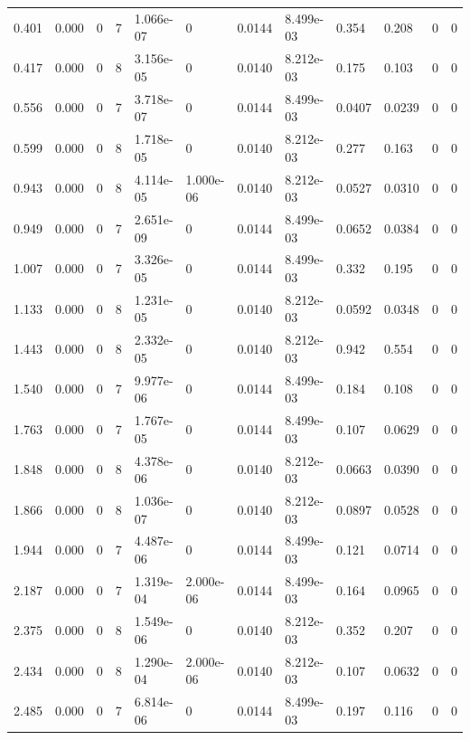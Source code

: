 \documentclass[preview]{standalone}
\begin{document}
{{\begin{tabular}{L{1.2cm}C{1.2cm} C{0.3cm}C{0.5cm} C{1.4cm}C{1.4cm} C{1.4cm}C{1.4cm} C{1.6cm}C{1.6cm} C{1.6cm}C{1.6cm}}
  0.401  &  0.000  & 0     &  7 &  1.066e-07  & 0  &  0.0144&   8.499e-03& 0.354 & 0.208   &  0 & 0  \\ 
  0.417  &  0.000  & 0     &  8 &  3.156e-05  & 0  &  0.0140&   8.212e-03& 0.175 & 0.103   &  0 & 0  \\ 
  0.556  &  0.000  & 0     &  7 &  3.718e-07  & 0  &  0.0144&   8.499e-03& 0.0407 & 0.0239   &  0 & 0  \\ 
  0.599  &  0.000  & 0     &  8 &  1.718e-05  & 0  &  0.0140&   8.212e-03& 0.277 & 0.163   &  0 & 0  \\ 
  0.943  &  0.000  & 0     &  8 &  4.114e-05  & 1.000e-06  &  0.0140&   8.212e-03& 0.0527 & 0.0310   &  0 & 0  \\ 
  0.949  &  0.000  & 0     &  7 &  2.651e-09  & 0  &  0.0144&   8.499e-03& 0.0652 & 0.0384   &  0 & 0  \\ 
  1.007  &  0.000  & 0     &  7 &  3.326e-05  & 0  &  0.0144&   8.499e-03& 0.332 & 0.195   &  0 & 0  \\ 
  1.133  &  0.000  & 0     &  8 &  1.231e-05  & 0  &  0.0140&   8.212e-03& 0.0592 & 0.0348   &  0 & 0  \\ 
  1.443  &  0.000  & 0     &  8 &  2.332e-05  & 0  &  0.0140&   8.212e-03& 0.942 & 0.554   &  0 & 0  \\ 
  1.540  &  0.000  & 0     &  7 &  9.977e-06  & 0  &  0.0144&   8.499e-03& 0.184 & 0.108   &  0 & 0  \\ 
  1.763  &  0.000  & 0     &  7 &  1.767e-05  & 0  &  0.0144&   8.499e-03& 0.107 & 0.0629   &  0 & 0  \\ 
  1.848  &  0.000  & 0     &  8 &  4.378e-06  & 0  &  0.0140&   8.212e-03& 0.0663 & 0.0390   &  0 & 0  \\ 
  1.866  &  0.000  & 0     &  8 &  1.036e-07  & 0  &  0.0140&   8.212e-03& 0.0897 & 0.0528   &  0 & 0  \\ 
  1.944  &  0.000  & 0     &  7 &  4.487e-06  & 0  &  0.0144&   8.499e-03& 0.121 & 0.0714   &  0 & 0  \\ 
  2.187  &  0.000  & 0     &  7 &  1.319e-04  & 2.000e-06  &  0.0144&   8.499e-03& 0.164 & 0.0965   &  0 & 0  \\ 
  2.375  &  0.000  & 0     &  8 &  1.549e-06  & 0  &  0.0140&   8.212e-03& 0.352 & 0.207   &  0 & 0  \\ 
  2.434  &  0.000  & 0     &  8 &  1.290e-04  & 2.000e-06  &  0.0140&   8.212e-03& 0.107 & 0.0632   &  0 & 0  \\ 
  2.485  &  0.000  & 0     &  7 &  6.814e-06  & 0  &  0.0144&   8.499e-03& 0.197 & 0.116   &  0 & 0  \\ 

\end{tabular}}}
\end{document}
